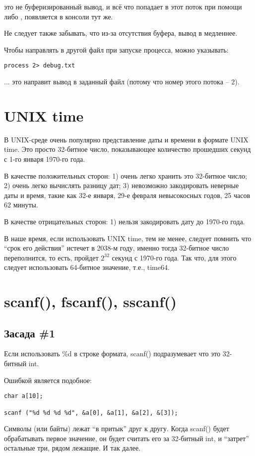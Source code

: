  это не буферизированный вывод, и всё что попадает в этот поток при помощи 
 либо , появляется в консоли тут же.

Не следует также забывать, что из-за отсутствия буфера, вывод в  медленнее.

Чтобы направлять  в другой файл при запуске процесса, можно указывать:

\begin{lstlisting}
process 2> debug.txt
\end{lstlisting}

... это направит вывод  в заданный файл (потому что номер этого потока -- 2).

\section{UNIX time}

В UNIX-среде очень популярно представление даты и времени в формате UNIX time.
Это просто 32-битное число, показывающее
количество прошедших секунд с 1-го января 1970-го года.

В качестве положительных сторон: 1) очень легко хранить это 32-битное число; 2) очень легко вычислять разницу дат;
3) невозможно закодировать неверные даты и время, такие как 32-е января, 29-е февраля невысокосных годов, 
25 часов 62 минуты.

В качестве отрицательных сторон: 1) нельзя закодировать дату до 1970-го года.

В наше время, если использовать UNIX time, тем не менее, следует помнить что ``срок его действия'' истечет
в 2038-м году, именно тогда 32-битное число переполнится, то есть, пройдет $2^{32}$ секунд с 1970-го года.
Так что, для этого следует использовать 64-битное значение, т.е., time64.


\section{scanf(), fscanf(), sscanf()}

\subsection{Засада \#1}

Если использовать \%d в строке формата, scanf() подразумевает что это 32-битный int. 

Ошибкой является подобное:

\begin{lstlisting}
char a[10];

scanf ("%d %d %d %d", &a[0], &a[1], &a[2], &[3]);
\end{lstlisting}

Символы (или байты) лежат ``в притык'' друг к другу. Когда scanf() будет обрабатывать первое значение, он будет считать
его за 32-битный int, и ``затрет'' остальные три, рядом лежащие. И так далее.

